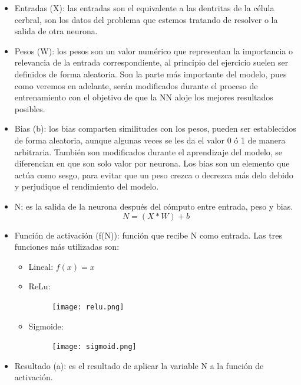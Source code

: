 \documentclass[a4paper,10pt]{article}
\begin{document}
\begin{itemize}
    \item Entradas (X): las entradas son el equivalente a las dentritas de la célula cerbral, son los datos del problema que estemos tratando de resolver o la salida de otra neurona.
    \item Pesos (W): los pesos son un valor numérico que representan la importancia o relevancia de la entrada correspondiente, al principio del ejercicio suelen ser definidos de forma aleatoria. Son la parte más importante del modelo, pues como veremos en adelante, serán modificados durante el proceso de entrenamiento con el objetivo de que la NN aloje los mejores resultados posibles.
    \item Bias (b): los bias comparten similitudes con los pesos, pueden ser establecidos de forma aleatoria, aunque algunas veces se les da el valor 0 ó 1 de manera arbitraria. También son modificados durante el aprendizaje del modelo, se diferencian en que son solo valor por neurona. Los bias son un elemento que actúa como sesgo, para evitar que un peso crezca o decrezca más delo debido y perjudique el rendimiento del modelo.
    \item N: es la salida de la neurona después del cómputo entre entrada, peso y bias.\\                                           \[N=(X*W)+b\]
    \item Función de activación (f(N)): función que recibe N como entrada. Las tres funciones más utilizadas son:
    \begin{itemize}
    \item Lineal: $f(x)=x$ 
    \item ReLu: 		\begin{figure}[H]
				\centering
				\texttt{[image: relu.png]}
				\end{figure}
    \item Sigmoide: 	\begin{figure}[H]
				\centering
				\texttt{[image: sigmoid.png]}
				\end{figure}
	
    \end{itemize}
    \item Resultado (a): es el resultado de aplicar la variable N a la función de activación.
        
\end{itemize}
\end{document}
